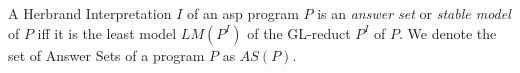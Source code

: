 \begin{definition}
\label{def:prelims-asp-semantics-answer-set}
A Herbrand Interpretation $I$ of an \gls{asp} program $P$ is an \emph{answer set} or \emph{stable model} of $P$ iff it is the least model $LM(P^I)$ of the GL-reduct $P^I$ of $P$. We denote the set of Answer Sets of a program $P$ as $\mathit{AS}(P)$.
\end{definition}





